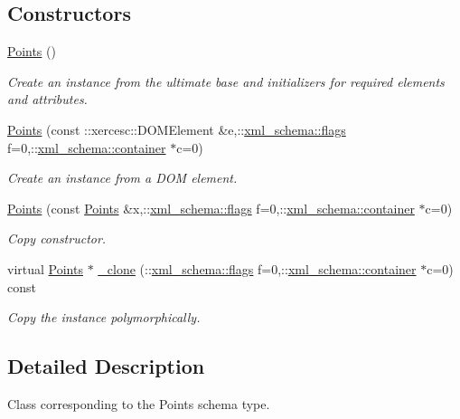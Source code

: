 \subsection*{Constructors}
\begin{DoxyCompactItemize}
\item 
\hyperlink{classPoints_aa4e68083d98bd04233c9753dfe1e46ab}{Points} ()
\begin{DoxyCompactList}\small\item\em Create an instance from the ultimate base and initializers for required elements and attributes. \end{DoxyCompactList}\item 
\hyperlink{classPoints_a36a1ac8ea9ac092adff2888915e81304}{Points} (const \-::xercesc\-::\-D\-O\-M\-Element \&e,\-::\hyperlink{namespacexml__schema_a0612287d030cb2732d31a45b258fdc87}{xml\-\_\-schema\-::flags} f=0,\-::\hyperlink{namespacexml__schema_ada9aa30dc722e93ee2ed7243085402a5}{xml\-\_\-schema\-::container} $\ast$c=0)
\begin{DoxyCompactList}\small\item\em Create an instance from a D\-O\-M element. \end{DoxyCompactList}\item 
\hyperlink{classPoints_ad49b51469dc53b028c244a88bd9fb08b}{Points} (const \hyperlink{classPoints}{Points} \&x,\-::\hyperlink{namespacexml__schema_a0612287d030cb2732d31a45b258fdc87}{xml\-\_\-schema\-::flags} f=0,\-::\hyperlink{namespacexml__schema_ada9aa30dc722e93ee2ed7243085402a5}{xml\-\_\-schema\-::container} $\ast$c=0)
\begin{DoxyCompactList}\small\item\em Copy constructor. \end{DoxyCompactList}\item 
virtual \hyperlink{classPoints}{Points} $\ast$ \hyperlink{classPoints_a5dff673c4b4a59465aee3ede80328ae9}{\-\_\-clone} (\-::\hyperlink{namespacexml__schema_a0612287d030cb2732d31a45b258fdc87}{xml\-\_\-schema\-::flags} f=0,\-::\hyperlink{namespacexml__schema_ada9aa30dc722e93ee2ed7243085402a5}{xml\-\_\-schema\-::container} $\ast$c=0) const 
\begin{DoxyCompactList}\small\item\em Copy the instance polymorphically. \end{DoxyCompactList}\end{DoxyCompactItemize}


\subsection{Detailed Description}
Class corresponding to the Points schema type. 

